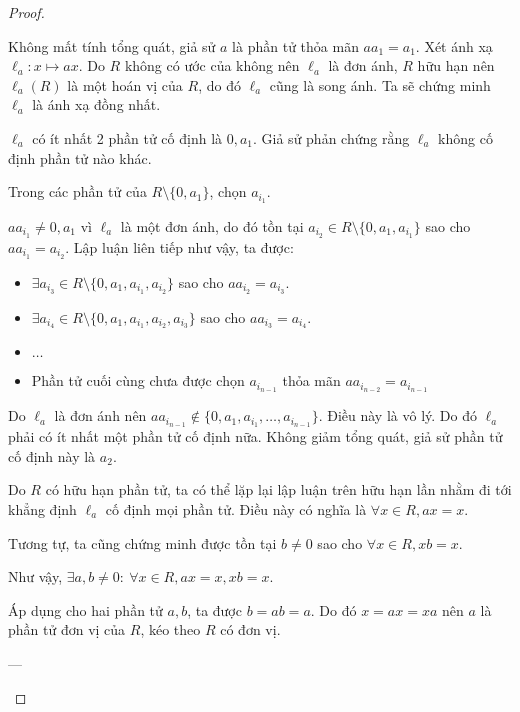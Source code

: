 \documentclass[class=linearalgebra,crop=false]{standalone}
\begin{document}
\begin{proof}
\begin{enumerate}[label = (\alph*)]
            \par Không mất tính tổng quát, giả sử $a$ là phần tử thỏa mãn $aa_{1} = a_{1}$. Xét ánh xạ $\ell_{a}: x\mapsto ax$. Do $R$ không có ước của không nên $\ell_{a}$ là đơn ánh, $R$ hữu hạn nên $\ell_{a}(R)$ là một hoán vị của $R$, do đó $\ell_{a}$ cũng là song ánh. Ta sẽ chứng minh $\ell_{a}$ là ánh xạ đồng nhất.
            \par $\ell_{a}$ có ít nhất 2 phần tử cố định là $0, a_{1}$. Giả sử phản chứng rằng $\ell_{a}$ không cố định phần tử nào khác.
            \par Trong các phần tử của $R\setminus\{0, a_{1}\}$, chọn $a_{i_{1}}$.
            \par $aa_{i_{1}}\ne 0, a_{1}$ vì $\ell_{a}$ là một đơn ánh, do đó tồn tại $a_{i_{2}} \in R\setminus\{0, a_{1}, a_{i_{1}}\}$ sao cho $aa_{i_{1}} = a_{i_{2}}$. Lập luận liên tiếp như vậy, ta được:
            \begin{itemize}
                \item $\exists a_{i_{3}} \in R\setminus \{ 0, a_{1}, a_{i_{1}}, a_{i_{2}} \}$ sao cho $aa_{i_{2}} = a_{i_{3}}$.
                \item $\exists a_{i_{4}} \in R\setminus \{ 0, a_{1}, a_{i_{1}}, a_{i_{2}}, a_{i_{3}} \}$ sao cho $aa_{i_{3}} = a_{i_{4}}$.
                \item $\ldots$
                \item Phần tử cuối cùng chưa được chọn $a_{i_{n - 1}}$ thỏa mãn $aa_{i_{n-2}} = a_{i_{n-1}}$
            \end{itemize}
            \par Do $\ell_{a}$ là đơn ánh nên $aa_{i_{n-1}}\not\in\{0, a_{1}, a_{i_{1}}, \ldots, a_{i_{n-1}}\}$. Điều này là vô lý. Do đó $\ell_{a}$ phải có ít nhất một phần tử cố định nữa. Không giảm tổng quát, giả sử phần tử cố định này là $a_{2}$.
            \par Do $R$ có hữu hạn phần tử, ta có thể lặp lại lập luận trên hữu hạn lần nhằm đi tới khẳng định $\ell_{a}$ cố định mọi phần tử. Điều này có nghĩa là $\forall x\in R, ax = x$.
            \par Tương tự, ta cũng chứng minh được tồn tại $b\ne 0$ sao cho $\forall x\in R, xb = x$.
            \par Như vậy, $\exists a,b\ne 0:\ \forall x\in R, ax = x, xb = x$.
            \par Áp dụng cho hai phần tử $a, b$, ta được $b = ab = a$. Do đó $x = ax = xa$ nên $a$ là phần tử đơn vị của $R$, kéo theo $R$ có đơn vị.
            \par ---

\end{enumerate}
\end{proof}
\end{document}

